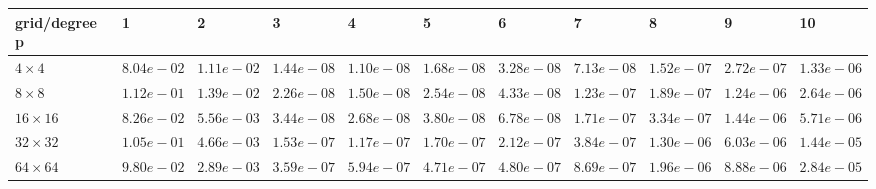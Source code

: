 \begin{tabular}{lllllllllll}
\hline
 grid/degree p   & 1          & 2          & 3          & 4          & 5          & 6          & 7          & 8          & 9          & 10         \\
\hline
 $4 \times 4$    & $8.04e-02$ & $1.11e-02$ & $1.44e-08$ & $1.10e-08$ & $1.68e-08$ & $3.28e-08$ & $7.13e-08$ & $1.52e-07$ & $2.72e-07$ & $1.33e-06$ \\
 $8 \times 8$    & $1.12e-01$ & $1.39e-02$ & $2.26e-08$ & $1.50e-08$ & $2.54e-08$ & $4.33e-08$ & $1.23e-07$ & $1.89e-07$ & $1.24e-06$ & $2.64e-06$ \\
 $16 \times 16$  & $8.26e-02$ & $5.56e-03$ & $3.44e-08$ & $2.68e-08$ & $3.80e-08$ & $6.78e-08$ & $1.71e-07$ & $3.34e-07$ & $1.44e-06$ & $5.71e-06$ \\
 $32 \times 32$  & $1.05e-01$ & $4.66e-03$ & $1.53e-07$ & $1.17e-07$ & $1.70e-07$ & $2.12e-07$ & $3.84e-07$ & $1.30e-06$ & $6.03e-06$ & $1.44e-05$ \\
 $64 \times 64$  & $9.80e-02$ & $2.89e-03$ & $3.59e-07$ & $5.94e-07$ & $4.71e-07$ & $4.80e-07$ & $8.69e-07$ & $1.96e-06$ & $8.88e-06$ & $2.84e-05$ \\
\hline
\end{tabular}